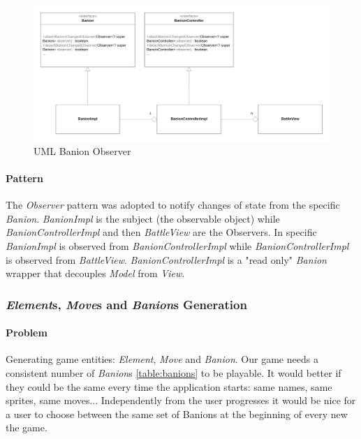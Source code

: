 \documentclass[12pt, a4paper]{report}
\theoremstyle{definition}
\begin{document}
            \begin{figure}[ht]
            \centering{}
            \includegraphics[width=\textwidth]{banion_changed}
            \caption{UML Banion Observer}
            \end{figure}

            \paragraph{Pattern}

            The \emph{Observer} pattern was adopted to notify changes of state from the specific \emph{Banion}.
            \emph{BanionImpl} is the subject (the observable object) while \emph{BanionControllerImpl} and then \emph{BattleView} are the Observers.
            In specific \emph{BanionImpl} is observed from \emph{BanionControllerImpl} while \emph{BanionControllerImpl} is observed from \emph{BattleView}.
            \emph{BanionControllerImpl} is a "read only" \emph{Banion} wrapper that decouples \emph{Model} from \emph{View}.
            
        \pagebreak

        \subsubsection{\emph{Element}s, \emph{Move}s and \emph{Banion}s Generation}

            \paragraph{Problem}
            
            Generating game entities: \emph{Element}, \emph{Move} and \emph{Banion}. Our game needs a consistent number of \emph{Banion}s \ref{table:banions} to be playable.
            It would better if they could be the same every time the application starts: same names, same sprites, same moves...
            Independently from the user progresses it would be nice for a user to choose between the same set of Banions at the beginning of every new the game.
\end{document}
